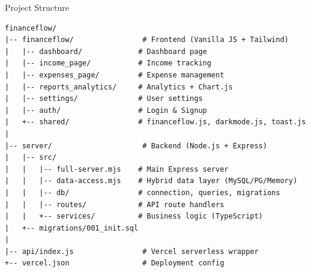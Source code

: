 \documentclass[aspectratio=169, 12pt]{beamer}
\begin{document}
\begin{frame}[fragile]{Project Structure}

\begin{lstlisting}
financeflow/
|-- financeflow/                # Frontend (Vanilla JS + Tailwind)
|   |-- dashboard/             # Dashboard page
|   |-- income_page/           # Income tracking
|   |-- expenses_page/         # Expense management
|   |-- reports_analytics/     # Analytics + Chart.js
|   |-- settings/              # User settings
|   |-- auth/                  # Login & Signup
|   +-- shared/                # financeflow.js, darkmode.js, toast.js
|
|-- server/                     # Backend (Node.js + Express)
|   |-- src/
|   |   |-- full-server.mjs    # Main Express server
|   |   |-- data-access.mjs    # Hybrid data layer (MySQL/PG/Memory)
|   |   |-- db/                # connection, queries, migrations
|   |   |-- routes/            # API route handlers
|   |   +-- services/          # Business logic (TypeScript)
|   +-- migrations/001_init.sql
|
|-- api/index.js                # Vercel serverless wrapper
+-- vercel.json                 # Deployment config
\end{lstlisting}
\end{frame}
\end{document}
